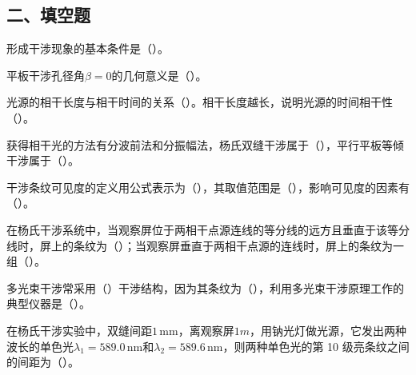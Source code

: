 \documentclass[standard, analysis, notocnum]{ExBook}
\newcommand{\answerarea}[1][8cm]{%
  \par\vspace{2mm}%
  \noindent{\color{themeColor!35}\rule{\linewidth}{0.4pt}}\par
  \noindent\begin{minipage}[t][#1][t]{\linewidth}\vspace{0pt}\end{minipage}\par
  \noindent{\color{themeColor!35}\rule{\linewidth}{0.4pt}}\par
}
\begin{document}
\subsection{二、填空题}
\begin{qitems}
\begin{bbox}
\qitem 形成干涉现象的基本条件是（\hspace{1.6em}）。
\answerarea[3.5cm]
\end{bbox}
\begin{bbox}
\qitem 平板干涉孔径角$\beta =0$的几何意义是（\hspace{1.6em}）。
\answerarea[3.5cm]
\end{bbox}
\begin{bbox}
\qitem 光源的相干长度与相干时间的关系（\hspace{1.6em}）。相干长度越长，说明光源的时间相干性（\hspace{1.6em}）。
\answerarea[3.5cm]
\end{bbox}
\begin{bbox}
\qitem 获得相干光的方法有分波前法和分振幅法，杨氏双缝干涉属于（\hspace{1.6em}），平行平板等倾干涉属于（\hspace{1.6em}）。
\answerarea[3.5cm]
\end{bbox}
\begin{bbox}
\qitem 干涉条纹可见度的定义用公式表示为（\hspace{1.6em}），其取值范围是（\hspace{1.6em}），影响可见度的因素有（\hspace{1.6em}）。
\answerarea[3.5cm]
\end{bbox}
\begin{bbox}
\qitem 在杨氏干涉系统中，当观察屏位于两相干点源连线的等分线的远方且垂直于该等分线时，屏上的条纹为（\hspace{1.6em}）；当观察屏垂直于两相干点源的连线时，屏上的条纹为一组（\hspace{1.6em}）。
\answerarea[3.5cm]
\end{bbox}
\begin{bbox}
\qitem 多光束干涉常采用（\hspace{1.6em}）干涉结构，因为其条纹为（\hspace{1.6em}），利用多光束干涉原理工作的典型仪器是（\hspace{1.6em}）。
\answerarea[3.5cm]
\end{bbox}
\begin{bbox}
\qitem 在杨氏干涉实验中，双缝间距$1\,\mathrm{mm}$，离观察屏$1m$，用钠光灯做光源，它发出两种波长的单色光$\lambda_{1}=589.0\,\mathrm{nm}$和$\lambda_{2}=589.6\,\mathrm{nm}$，则两种单色光的第 10 级亮条纹之间的间距为（\hspace{1.6em}）。

\end{bbox}
\end{qitems}
\end{document}
